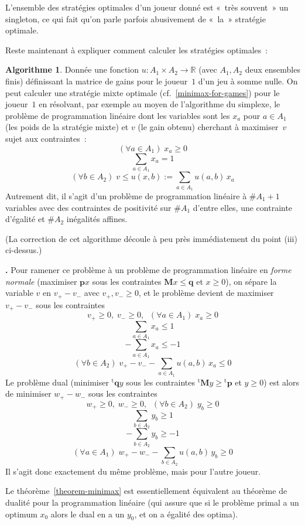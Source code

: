 \documentclass[12pt,a4paper]{article}
\theoremstyle{definition}
\newcommand\thingy{%
\refstepcounter{comcnt}\smallskip\noindent\textbf{\thecomcnt.} }
\newtheorem{algo}[comcnt]{Algorithme}
\begin{document}
L'ensemble des stratégies optimales d'un joueur donné est « très
souvent » un singleton, ce qui fait qu'on parle parfois abusivement de
« la » stratégie optimale.

Reste maintenant à expliquer comment calculer les stratégies
optimales :

\begin{algo}\label{zero-sum-games-by-linear-programming-algorithm}
Donnée une fonction $u\colon A_1 \times A_2 \to \mathbb{R}$ (avec
$A_1,A_2$ deux ensembles finis) définissant la matrice de gains pour
le joueur $1$ d'un jeu à somme nulle.  On peut calculer une stratégie
mixte optimale (cf. \ref{minimax-for-games}) pour le joueur $1$ en
résolvant, par exemple au moyen de l'algorithme du simplexe, le
problème de programmation linéaire dont les variables sont les $x_a$
pour $a \in A_1$ (les poids de la stratégie mixte) et $v$ (le gain
obtenu) cherchant à maximiser $v$ sujet aux contraintes :
\[(\forall a\in A_1)\;x_a \geq 0\]
\[\sum_{a\in A_1} x_a = 1\]
\[(\forall b\in A_2)\;v \leq u(x,b) := \sum_{a \in A_1} u(a,b)\, x_a\]
Autrement dit, il s'agit d'un problème de programmation linéaire à
$\#A_1 + 1$ variables avec des contraintes de positivité sur $\#A_1$
d'entre elles, une contrainte d'égalité et $\#A_2$ inégalités affines.
\end{algo}

(La correction de cet algorithme découle à peu près immédiatement du
point (iii) ci-dessus.)

\thingy Pour ramener ce problème à un problème de programmation
linéaire en \emph{forme normale} (maximiser $\textbf{p} x$ sous les
contraintes $\textbf{M} x \leq \textbf{q}$ et $x\geq 0$), on sépare la
variable $v$ en $v_+ - v_-$ avec $v_+,v_- \geq 0$, et le problème
devient de maximiser $v_+ - v_-$ sous les contraintes
\[v_+\geq 0,\; v_- \geq 0,\;\; (\forall a\in A_1)\;x_a \geq 0\]
\[\sum_{a\in A_1} x_a \leq 1\]
\[-\sum_{a\in A_1} x_a \leq -1\]
\[(\forall b\in A_2)\;v_+ - v_- - \sum_{a \in A_1} u(a,b)\, x_a \leq 0\]
Le problème dual (minimiser ${^{\mathrm{t}}\textbf{q}} y$ sous les
contraintes ${^{\mathrm{t}}\textbf{M}} y \geq {^\mathrm{t}\textbf{p}}$
et $y\geq 0$) est alors de minimiser $w_+ - w_-$ sous les contraintes
\[w_+\geq 0,\; w_- \geq 0,\;\; (\forall b\in A_2)\;y_b \geq 0\]
\[\sum_{b\in A_2} y_b \geq 1\]
\[-\sum_{b\in A_2} y_b \geq -1\]
\[(\forall a\in A_1)\;w_+ - w_- - \sum_{b \in A_2} u(a,b)\, y_b \geq 0\]
Il s'agit donc exactement du même problème, mais pour l'autre joueur.

Le théorème \ref{theorem-minimax} est essentiellement équivalent au
théorème de dualité pour la programmation linéaire (qui assure que si
le problème primal a un optimum $x_0$ alors le dual en a un $y_0$, et
on a égalité des optima).
\end{document}
